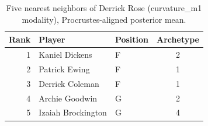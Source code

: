 \begin{table}[htbp]
  \centering\small
  \begin{tabular}{rllc}
    \toprule
    Rank & Player & Position & Archetype \\
    \midrule
    1 & Kaniel Dickens & F & 2 \\
    2 & Patrick Ewing & F & 1 \\
    3 & Derrick Coleman & F & 1 \\
    4 & Archie Goodwin & G & 2 \\
    5 & Izaiah Brockington & G & 4 \\
    \bottomrule
  \end{tabular}
  \caption{Five nearest neighbors of Derrick Rose (curvature_m1 modality), Procrustes-aligned posterior mean.}
  \label{tab:Derrick_Rose_neighbors_curvature_m1}
\end{table}


